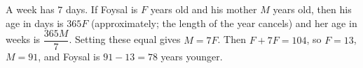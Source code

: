 A week has $7$ days. If Foysal is $F$ years old and his mother $M$ years old, then his age in days is $365F$ (approximately; the length of the year cancels) and her age in weeks is $\dfrac{365M}{7}$. Setting these equal gives $M=7F$. Then $F+7F=104$, so $F=13$, $M=91$, and Foysal is $91-13=\boxed{78}$ years younger.
